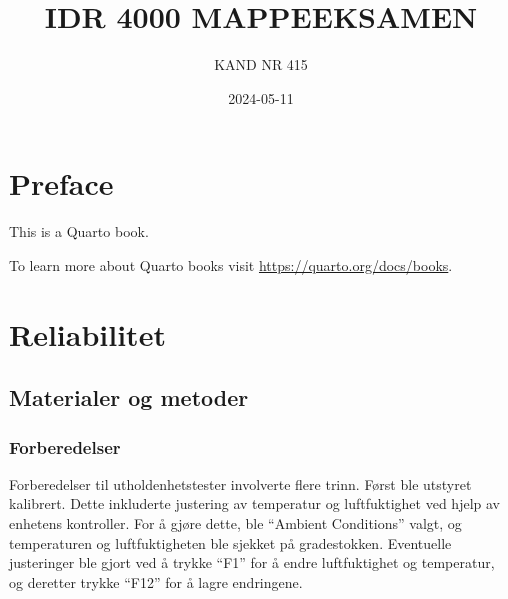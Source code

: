 \documentclass[
  letterpaper,
  DIV=11,
  numbers=noendperiod]{scrreprt}
\title{IDR 4000 MAPPEEKSAMEN}
\author{KAND NR 415}
\date{2024-05-11}
\renewcommand*\contentsname{Table of contents}
\newcommand\contentsname{Table of contents}
\begin{document}
\maketitle
\ifdefined\Shaded\renewenvironment{Shaded}{\begin{tcolorbox}[interior hidden, breakable, borderline west={3pt}{0pt}{shadecolor}, frame hidden, sharp corners, enhanced, boxrule=0pt]}{\end{tcolorbox}}\fi

\renewcommand*\contentsname{Table of contents}
{
\hypersetup{linkcolor=}
\setcounter{tocdepth}{2}
\tableofcontents
}

\hypertarget{preface}{%
\chapter*{Preface}\label{preface}}


This is a Quarto book.

To learn more about Quarto books visit
\url{https://quarto.org/docs/books}.


\hypertarget{reliabilitet}{%
\chapter{Reliabilitet}\label{reliabilitet}}

\hypertarget{materialer-og-metoder}{%
\section{Materialer og metoder}\label{materialer-og-metoder}}

\hypertarget{forberedelser}{%
\subsection{Forberedelser}\label{forberedelser}}

Forberedelser til utholdenhetstester involverte flere trinn. Først ble
utstyret kalibrert. Dette inkluderte justering av temperatur og
luftfuktighet ved hjelp av enhetens kontroller. For å gjøre dette, ble
``Ambient Conditions'' valgt, og temperaturen og luftfuktigheten ble
sjekket på gradestokken. Eventuelle justeringer ble gjort ved å trykke
``F1'' for å endre luftfuktighet og temperatur, og deretter trykke
``F12'' for å lagre endringene.
\end{document}
